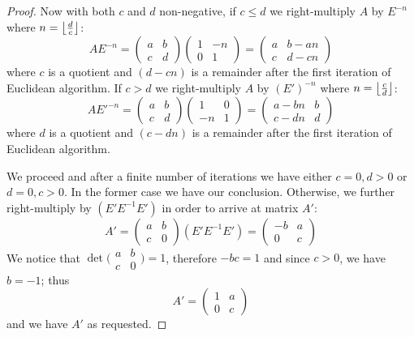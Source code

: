 \documentclass{article}
\theoremstyle{definition}
\DeclarePairedDelimiter\floor{\lfloor}{\rfloor}
\begin{document}
\begin{proof}
Now with both $c$ and $d$ non-negative, if $c \leq d$ we right-multiply $A$ by $E^{-n}$ where $n = \floor*{ \frac{d}{c} }$:
\[
    A E^{-n} =   
    \begin{pmatrix}
        a & b \\
        c & d
    \end{pmatrix}
    \begin{pmatrix}
        1 & -n \\
        0 & 1
    \end{pmatrix}
    =
    \begin{pmatrix}
        a & b-an \\
        c & d-cn
    \end{pmatrix}
\]
where $c$ is a quotient and $(d-cn)$ is a remainder after the first iteration of Euclidean algorithm.
If $c > d$ we right-multiply $A$ by $(E')^{-n}$ where $n = \floor*{ \frac{c}{d} }$:
\[
    A E'^{-n} =   
    \begin{pmatrix}
        a & b \\
        c & d
    \end{pmatrix}
    \begin{pmatrix}
        1 & 0 \\
        -n & 1
    \end{pmatrix}
    =
    \begin{pmatrix}
        a-bn & b \\
        c-dn & d
    \end{pmatrix}
\]
where $d$ is a quotient and $(c-dn)$ is a remainder after the first iteration of Euclidean algorithm.

We proceed and after a finite number of iterations we have either $c=0, d>0$ or $d=0, c>0$.
In the former case we have our conclusion.
Otherwise, we further right-multiply by $(E' E^{-1} E')$ in order to arrive at matrix $A'$:
\[
    A' =
    \begin{pmatrix}
        a & b \\
        c & 0
    \end{pmatrix}
    (E' E^{-1} E')
    =
    \begin{pmatrix}
        -b & a \\
        0 & c
    \end{pmatrix}
\]
We notice that
$
\det
\bigl(
\begin{smallmatrix}
    a & b \\
    c & 0
\end{smallmatrix}
\bigr)
=1 $, therefore $-bc=1$ and since $c > 0$, we have $b = -1$; thus
\[
    A' =
    \begin{pmatrix}
        1 & a \\
        0 & c
    \end{pmatrix}
\]
and we have $A'$ as requested.

\end{proof}
\end{document}
